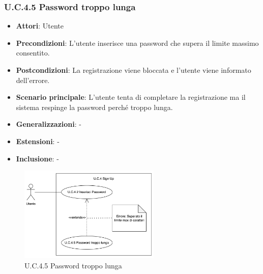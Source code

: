 \subsubsection{U.C.4.5 Password troppo lunga}
\begin{itemize}
    \item \textbf{Attori}: Utente
    \item \textbf{Precondizioni}: L'utente inserisce una password che supera il limite massimo consentito.
    \item \textbf{Postcondizioni}: La registrazione viene bloccata e l'utente viene informato dell'errore.
    \item \textbf{Scenario principale}: L'utente tenta di completare la registrazione ma il sistema respinge la password perché troppo lunga. 
    \item \textbf{Generalizzazioni}: -
    \item \textbf{Estensioni}: -
    \item \textbf{Inclusione}: -
\end{itemize}
\begin{figure}[H]
    \centering
    \includegraphics[width=0.6\textwidth]{img/U.C.4.5.png}
    \caption{U.C.4.5 Password troppo lunga}
\end{figure}
\newpage


